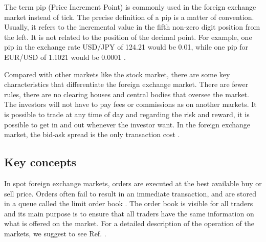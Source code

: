 The term pip (Price Increment Point) is commonly used in the foreign exchange
market instead of tick. The precise definition of a pip is a matter of
convention. Usually, it refers to the incremental value in the fifth non-zero
digit position from the left. It is not related to the position of the decimal
point. For example, one pip in the exchange rate USD/JPY of 124.21 would be
0.01, while one pip for EUR/USD of 1.1021 would be 0.0001
\cite{forex_structure,micro_eff,forex_market_micro,book_forex_3,order_flow_forex}.

Compared with other markets like the stock market, there are some key
characteristics that differentiate the foreign exchange market. There are fewer
rules, there are no clearing houses and central bodies that oversee the market.
The investors will not have to pay fees or commissions as on another markets.
It is possible to trade at any time of day and regarding the risk and reward,
it is possible to get in and out whenever the investor want. In the foreign
exchange market, the bid-ask spread is the only transaction cost
\cite{book_forex_2}.

\subsection{Key concepts}\label{subsec:key_concepts}

In spot foreign exchange markets, orders are executed at the best available buy
or sell price. Orders often fail to result in an immediate transaction, and are
stored in a queue called the limit order book
\cite{forex_structure,forex_market_micro,stat_prop,predictive_pow,intro_market_micro,prop_order_book}.
The order book is visible for all traders and its main purpose is to ensure
that all traders have the same information on what is offered on the market.
For a detailed description of the operation of the markets, we suggest to see
Ref. \cite{my_paper_response_financial}.

